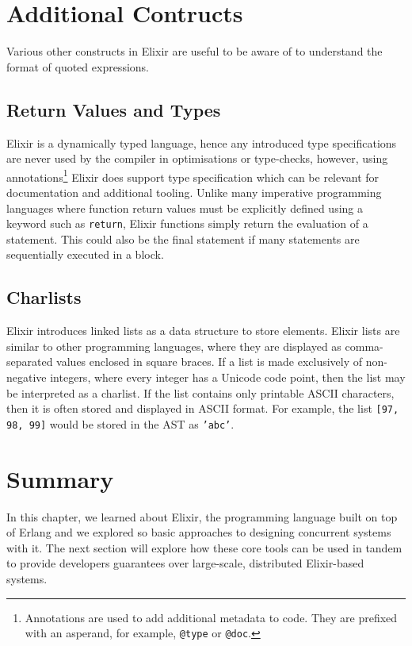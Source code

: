 \section{Additional Contructs}
Various other constructs in Elixir are useful to be aware of to understand the format of quoted expressions.
\subsection{Return Values and Types}
Elixir is a dynamically typed language, hence any introduced type specifications are never used by the compiler in optimisations or type-checks, however, using annotations\footnote{Annotations are used to add additional metadata to code. They are prefixed with an asperand, for example, \texttt{@type} or \texttt{@doc}.} Elixir does support type specification which can be relevant for documentation and additional tooling. Unlike many imperative programming languages where function return values must be explicitly defined using a keyword such as \texttt{return}, Elixir functions simply return the evaluation of a statement. This could also be the final statement if many statements are sequentially executed in a block.

\subsection{Charlists}
Elixir introduces linked lists as a data structure to store elements. Elixir lists are similar to other programming languages, where they are displayed as comma-separated values enclosed in square braces. If a list is made exclusively of non-negative integers, where every integer has a Unicode code point, then the list may be interpreted as a charlist. If the list contains only printable ASCII characters, then it is often stored and displayed in ASCII format. For example, the list \texttt{[97, 98, 99]} would be stored in the AST as \texttt{'abc'}.

\section{Summary}
In this chapter, we learned about Elixir, the programming language built on top of Erlang and we explored so basic approaches to designing concurrent systems with it. The next section will explore how these core tools can be used in tandem to provide developers guarantees over large-scale, distributed Elixir-based systems.